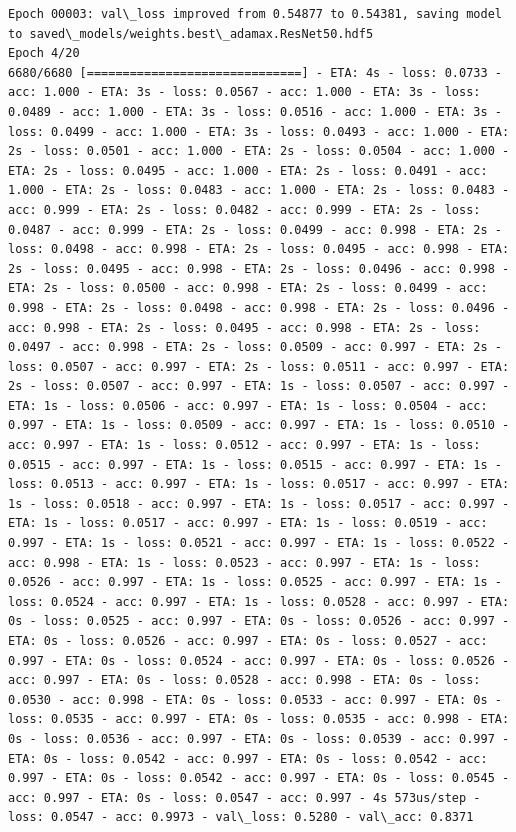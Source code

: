 \documentclass[11pt]{article}
\begin{document}
\begin{Verbatim}[commandchars=\\\{\}]
Epoch 00003: val\_loss improved from 0.54877 to 0.54381, saving model to saved\_models/weights.best\_adamax.ResNet50.hdf5
Epoch 4/20
6680/6680 [==============================] - ETA: 4s - loss: 0.0733 - acc: 1.000 - ETA: 3s - loss: 0.0567 - acc: 1.000 - ETA: 3s - loss: 0.0489 - acc: 1.000 - ETA: 3s - loss: 0.0516 - acc: 1.000 - ETA: 3s - loss: 0.0499 - acc: 1.000 - ETA: 3s - loss: 0.0493 - acc: 1.000 - ETA: 2s - loss: 0.0501 - acc: 1.000 - ETA: 2s - loss: 0.0504 - acc: 1.000 - ETA: 2s - loss: 0.0495 - acc: 1.000 - ETA: 2s - loss: 0.0491 - acc: 1.000 - ETA: 2s - loss: 0.0483 - acc: 1.000 - ETA: 2s - loss: 0.0483 - acc: 0.999 - ETA: 2s - loss: 0.0482 - acc: 0.999 - ETA: 2s - loss: 0.0487 - acc: 0.999 - ETA: 2s - loss: 0.0499 - acc: 0.998 - ETA: 2s - loss: 0.0498 - acc: 0.998 - ETA: 2s - loss: 0.0495 - acc: 0.998 - ETA: 2s - loss: 0.0495 - acc: 0.998 - ETA: 2s - loss: 0.0496 - acc: 0.998 - ETA: 2s - loss: 0.0500 - acc: 0.998 - ETA: 2s - loss: 0.0499 - acc: 0.998 - ETA: 2s - loss: 0.0498 - acc: 0.998 - ETA: 2s - loss: 0.0496 - acc: 0.998 - ETA: 2s - loss: 0.0495 - acc: 0.998 - ETA: 2s - loss: 0.0497 - acc: 0.998 - ETA: 2s - loss: 0.0509 - acc: 0.997 - ETA: 2s - loss: 0.0507 - acc: 0.997 - ETA: 2s - loss: 0.0511 - acc: 0.997 - ETA: 2s - loss: 0.0507 - acc: 0.997 - ETA: 1s - loss: 0.0507 - acc: 0.997 - ETA: 1s - loss: 0.0506 - acc: 0.997 - ETA: 1s - loss: 0.0504 - acc: 0.997 - ETA: 1s - loss: 0.0509 - acc: 0.997 - ETA: 1s - loss: 0.0510 - acc: 0.997 - ETA: 1s - loss: 0.0512 - acc: 0.997 - ETA: 1s - loss: 0.0515 - acc: 0.997 - ETA: 1s - loss: 0.0515 - acc: 0.997 - ETA: 1s - loss: 0.0513 - acc: 0.997 - ETA: 1s - loss: 0.0517 - acc: 0.997 - ETA: 1s - loss: 0.0518 - acc: 0.997 - ETA: 1s - loss: 0.0517 - acc: 0.997 - ETA: 1s - loss: 0.0517 - acc: 0.997 - ETA: 1s - loss: 0.0519 - acc: 0.997 - ETA: 1s - loss: 0.0521 - acc: 0.997 - ETA: 1s - loss: 0.0522 - acc: 0.998 - ETA: 1s - loss: 0.0523 - acc: 0.997 - ETA: 1s - loss: 0.0526 - acc: 0.997 - ETA: 1s - loss: 0.0525 - acc: 0.997 - ETA: 1s - loss: 0.0524 - acc: 0.997 - ETA: 1s - loss: 0.0528 - acc: 0.997 - ETA: 0s - loss: 0.0525 - acc: 0.997 - ETA: 0s - loss: 0.0526 - acc: 0.997 - ETA: 0s - loss: 0.0526 - acc: 0.997 - ETA: 0s - loss: 0.0527 - acc: 0.997 - ETA: 0s - loss: 0.0524 - acc: 0.997 - ETA: 0s - loss: 0.0526 - acc: 0.997 - ETA: 0s - loss: 0.0528 - acc: 0.998 - ETA: 0s - loss: 0.0530 - acc: 0.998 - ETA: 0s - loss: 0.0533 - acc: 0.997 - ETA: 0s - loss: 0.0535 - acc: 0.997 - ETA: 0s - loss: 0.0535 - acc: 0.998 - ETA: 0s - loss: 0.0536 - acc: 0.997 - ETA: 0s - loss: 0.0539 - acc: 0.997 - ETA: 0s - loss: 0.0542 - acc: 0.997 - ETA: 0s - loss: 0.0542 - acc: 0.997 - ETA: 0s - loss: 0.0542 - acc: 0.997 - ETA: 0s - loss: 0.0545 - acc: 0.997 - ETA: 0s - loss: 0.0547 - acc: 0.997 - 4s 573us/step - loss: 0.0547 - acc: 0.9973 - val\_loss: 0.5280 - val\_acc: 0.8371


\end{Verbatim}
\end{document}
